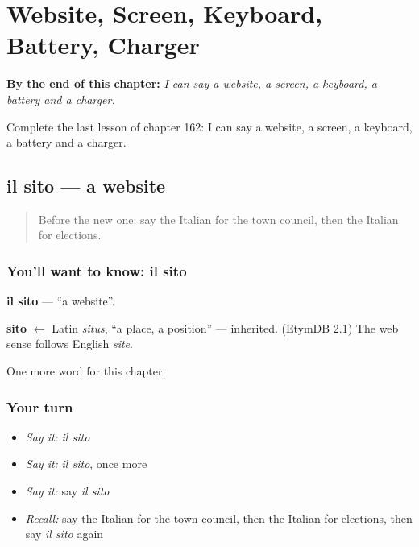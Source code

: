 
\chapter{Website, Screen, Keyboard, Battery, Charger}
\label{ch:it-website-screen-keyboard-battery-charger}

\begin{chapteropening}
\textbf{By the end of this chapter:} \emph{I can say a website, a screen, a keyboard, a battery and a charger.}

Complete the last lesson of chapter 162: I can say a website, a screen, a keyboard, a battery and a charger.
\end{chapteropening}

\section[il sito]{il sito — a website}

\label{lesson:IT-C162-sito}



\begin{quote}
Before the new one: say the Italian for the town council, then the Italian for elections.
\end{quote}

\subsection*{You'll want to know: il sito}
\textbf{il sito} — \textquotedblleft{}a website\textquotedblright{}.

\begin{cousinweb}
\textbf{sito} $\leftarrow$ Latin \emph{situs}, \textquotedblleft{}a place, a position\textquotedblright{} — inherited. (EtymDB 2.1) The web sense follows English \emph{site}.
\end{cousinweb}

\begin{grammarlens}[title={What you've built}]
One more word for this chapter.
\end{grammarlens}

\subsection*{Your turn}
\begin{itemize}
\raggedright
  \item \emph{Say it:} \emph{il sito}
  \item \emph{Say it:} \emph{il sito}, once more
  \item \emph{Say it:} say \emph{il sito}
  \item \emph{Recall:} say the Italian for the town council, then the Italian for elections, then say \emph{il sito} again
\end{itemize}

